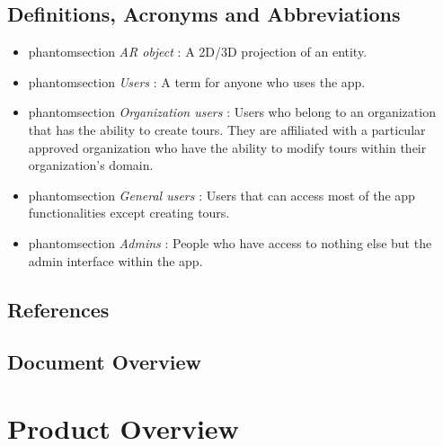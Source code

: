 \documentclass{article}
\makeatletter
\newcommand{\labeltext}[3][]{%
    \@bsphack%
    \csname phantomsection\endcsname%
    \def\tst{#1}%
    \def\labelmarkup{\emph}%
    \def\refmarkup{}%
    \ifx\tst\empty\def\@currentlabel{\refmarkup{#2}}{\label{#3}}%
    \else\def\@currentlabel{\refmarkup{#1}}{\label{#3}}\fi%
    \@esphack%
    \labelmarkup{#2}%
}
\makeatother
\begin{document}
\subsection{Definitions, Acronyms and Abbreviations}
\label{sub:def_acr_abb}

\begin{itemize}
    \item \labeltext{AR object}{def:ar_obj}: A 2D/3D projection of an entity.
    \item \labeltext{Users}{def:user}: A term for anyone who uses the app.
    \item \labeltext{Organization users}{def:org_user}: Users who belong to an organization that has the ability to create tours. They are affiliated with a particular approved organization who have the ability to modify tours within their organization’s domain.
    \item \labeltext{General users}{def:gen_user}: Users that can access most of the app functionalities except creating tours.
    \item \labeltext{Admins}{def:admin}: People who have access to nothing else but the admin interface within the app.
\end{itemize}

\subsection{References}
\label{sub:references}


\begingroup
\raggedright

\endgroup


\subsection{Document Overview}


\section{Product Overview}
\end{document}
